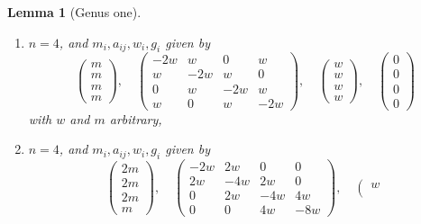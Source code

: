 \documentclass{stacks-project}
\theoremstyle{plain}
\newtheorem{lemma}[subsection]{Lemma}
\theoremstyle{definition}
\theoremstyle{remark}
\numberwithin{equation}{subsection}
\begin{document}
\begin{lemma}[Genus one]
\begin{enumerate}
$$\begin{matrix}
0 & 2w & -4w
\end{matrix}
\right),
\quad
\left(
\begin{matrix}
2w \\
w \\
2w
\end{matrix}
\right),
\quad
\left(
\begin{matrix}
0 \\
0 \\
0
\end{matrix}
\right)
$$
with $w$ and $m$ arbitrary,
\item
\label{item-four-cycle}
$n = 4$, and $m_i, a_{ij}, w_i, g_i$ given by
$$
\left(
\begin{matrix}
m \\
m \\
m \\
m
\end{matrix}
\right),
\quad
\left(
\begin{matrix}
-2w & w & 0 & w \\
w & -2w & w & 0 \\
0 & w & -2w & w \\
w & 0 & w & -2w
\end{matrix}
\right),
\quad
\left(
\begin{matrix}
w \\
w \\
w \\
w
\end{matrix}
\right),
\quad
\left(
\begin{matrix}
0 \\
0 \\
0 \\
0
\end{matrix}
\right)
$$
with $w$ and $m$ arbitrary,
\item
\label{item-up-equal-up}
$n = 4$, and $m_i, a_{ij}, w_i, g_i$ given by
$$
\left(
\begin{matrix}
2m \\
2m \\
2m \\
m
\end{matrix}
\right),
\quad
\left(
\begin{matrix}
-2w & 2w & 0 & 0 \\
2w & -4w & 2w & 0 \\
0 & 2w & -4w & 4w \\
0 & 0 & 4w & -8w
\end{matrix}
\right),
\quad
\left(
\begin{matrix}
w \\

\end{matrix}$$
\end{enumerate}
\end{lemma}
\end{document}

